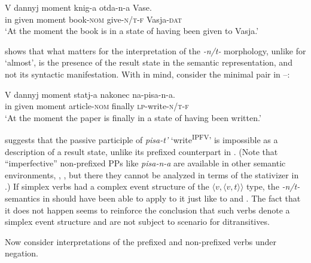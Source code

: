 \documentclass[output=paper,colorlinks,citecolor=brown]{langscibook}
\begin{document}
\ea\label{ex:tatevosov:iii}
\gll V  dannyj  moment  knig-a  otda-n-a  Vase.\\
in  given  moment  book-\textsc{nom}  give-\textsc{n/t-f}  Vasja-\textsc{dat}\\
\glt ‘At the moment the book is in a state of having been given to Vasja.’ 
\z

\noindent {} shows that what matters for the interpretation of the \textit{-n/t-} morphology, unlike for ‘almost’, is the presence of the result state in the semantic representation, and not its syntactic manifestation.  With  in mind, consider the minimal pair in --:

\ea\label{ex:tatevosov:iv}
\gll V  dannyj  moment  statj-a  nakonec  na-pisa-n-a.\\    in  given  moment  article-\textsc{nom}  finally  \textsc{lp}-write-\textsc{n/t-f}\\    
\glt ‘At the moment the paper is finally in a state of having been written.’ 
\z 

\z 

\noindent {} suggests that the passive participle of \textit{pisa-t’} ‘write\textsuperscript{IPFV}’ is impossible as a description of a result state, unlike its prefixed counterpart in . (Note that “imperfective” non-prefixed PPs like \textit{pisa-n-a} are available in other semantic environments, \citealt{Borik.Gehrke2018}, , but there they cannot be analyzed in terms of the stativizer in .) If simplex verbs had a complex event structure of the $\langle v, \langle v,t \rangle \rangle$ type, the \textit{-n/t-} semantics in  should have been able to apply to it just like to  and . The fact that it does not happen seems to reinforce the conclusion that such verbs denote a simplex event structure and are not subject to  scenario for ditransitives.

Now consider interpretations of the prefixed and non-prefixed verbs under negation. 
\end{document}
